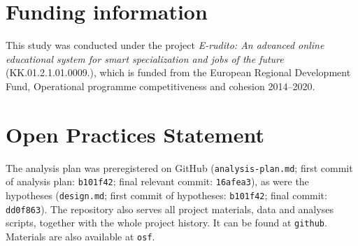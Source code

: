 \documentclass[12pt]{article}
\begin{document}
\clearpage

\section{Funding information}

This study was conducted under the project \textit{E-rudito: An
advanced online educational system for smart specialization and jobs of the
future} (KK.01.2.1.01.0009.), which is funded from the European Regional
Development Fund, Operational programme competitiveness and cohesion 2014--2020.

\section{Open Practices Statement}

The analysis plan was preregistered on GitHub (\texttt{analysis-plan.md};
first commit of analysis plan: \texttt{b101f42}; final relevant commit:
\texttt{16afea3}), as were the hypotheses (\texttt{design.md}; first commit of hypotheses:
\texttt{b101f42}; final commit: \texttt{dd0f863}).  The repository also serves all
project materials, data and analyses scripts, together with the whole project
history. It can be found at \texttt{github}.
Materials are also available at \texttt{osf}.

{}


\end{document}
